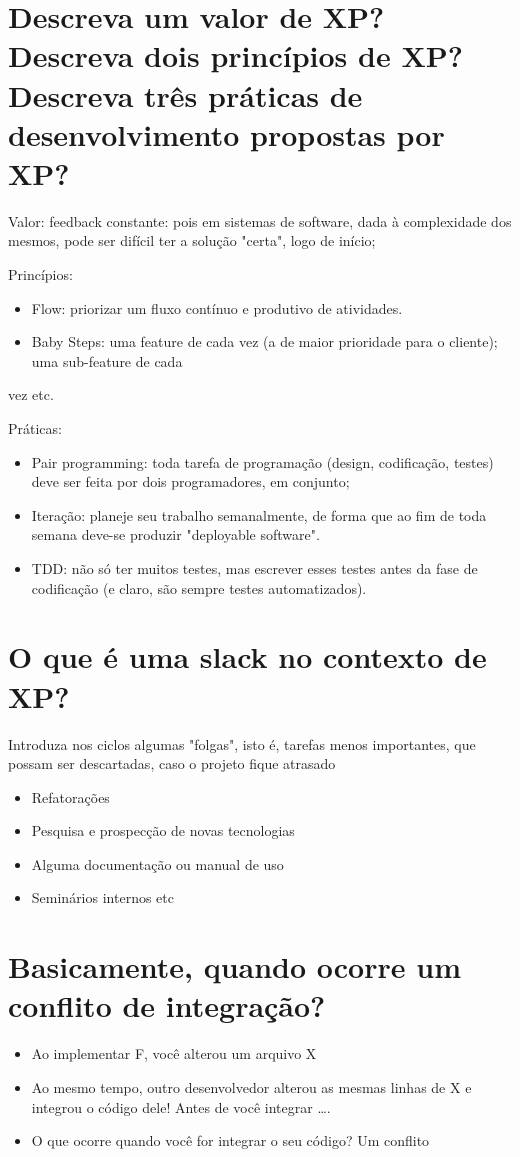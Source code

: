 \documentclass[11pt]{article}
\begin{document}
\section{Descreva um valor de XP? Descreva dois princípios de XP? Descreva três práticas de desenvolvimento propostas por XP?}
\label{sec:org5c6e362}
Valor: feedback constante: pois em sistemas de software, dada à complexidade dos mesmos,
  pode ser difícil ter a solução "certa", logo de início; 

Princípios:
\begin{itemize}
\item Flow: priorizar um fluxo contínuo e produtivo de atividades.
\item Baby Steps: uma feature de cada vez (a de maior prioridade para o cliente); uma sub-feature de cada
\end{itemize}
vez etc.

Práticas:
\begin{itemize}
\item Pair programming: toda tarefa de programação (design, codificação, testes) deve ser
feita por dois programadores, em conjunto;
\item Iteração: planeje seu trabalho semanalmente, de forma que ao fim de toda semana
deve-se produzir "deployable software".
\item TDD: não só ter muitos testes, mas escrever esses testes antes da fase de codificação
(e claro, são sempre testes automatizados).
\end{itemize}



\section{O que é uma slack no contexto de XP?}
\label{sec:org828947e}
Introduza nos ciclos algumas "folgas", isto é, tarefas menos importantes, que possam ser descartadas, caso o projeto fique atrasado
\begin{itemize}
\item Refatorações
\item Pesquisa e prospecção de novas tecnologias
\item Alguma documentação ou manual de uso
\item Seminários internos etc
\end{itemize}

\section{Basicamente, quando ocorre um conflito de integração?}
\label{sec:org97ba939}
\begin{itemize}
\item Ao implementar F, você alterou um arquivo X
\item Ao mesmo tempo, outro desenvolvedor alterou as mesmas linhas de X e integrou o código dele! Antes de você integrar ….
\item O que ocorre quando você for integrar o seu código? Um conflito
\end{itemize}
\end{document}
